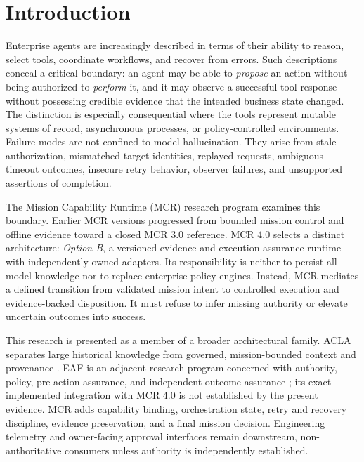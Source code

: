 \documentclass[11pt,twocolumn]{article}
\begin{document}
\section{Introduction}
Enterprise agents are increasingly described in terms of their ability to reason, select tools, coordinate workflows, and recover from errors. Such descriptions conceal a critical boundary: an agent may be able to \emph{propose} an action without being authorized to \emph{perform} it, and it may observe a successful tool response without possessing credible evidence that the intended business state changed. The distinction is especially consequential where the tools represent mutable systems of record, asynchronous processes, or policy-controlled environments. Failure modes are not confined to model hallucination. They arise from stale authorization, mismatched target identities, replayed requests, ambiguous timeout outcomes, insecure retry behavior, observer failures, and unsupported assertions of completion.

The Mission Capability Runtime (MCR) research program examines this boundary. Earlier MCR versions progressed from bounded mission control and offline evidence toward a closed MCR 3.0 reference. MCR 4.0 selects a distinct architecture: \emph{Option B}, a versioned evidence and execution-assurance runtime with independently owned adapters. Its responsibility is neither to persist all model knowledge nor to replace enterprise policy engines. Instead, MCR mediates a defined transition from validated mission intent to controlled execution and evidence-backed disposition. It must refuse to infer missing authority or elevate uncertain outcomes into success.

This research is presented as a member of a broader architectural family. ACLA separates large historical knowledge from governed, mission-bounded context and provenance \cite{deshpandeACLA}. EAF is an adjacent research program concerned with authority, policy, pre-action assurance, and independent outcome assurance \cite{deshpandeEAF}; its exact implemented integration with MCR 4.0 is not established by the present evidence. MCR adds capability binding, orchestration state, retry and recovery discipline, evidence preservation, and a final mission decision. Engineering telemetry and owner-facing approval interfaces remain downstream, non-authoritative consumers unless authority is independently established.
\end{document}
